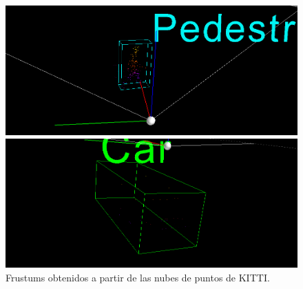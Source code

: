 \begin{figure}[H]
	\begin{minipage}{0.495\textwidth}
		\centering
		\includegraphics[width=1\linewidth]{Book/figures/7_roi/kitti_pcl_frustum_0.png}
	\end{minipage}\hfill
	\begin{minipage}{0.495\textwidth}
		\centering
		\includegraphics[width=1\linewidth]{Book/figures/7_roi/kitti_pcl_frustum_2.png}
	\end{minipage}
	\caption{Frustums obtenidos a partir de las nubes de puntos de KITTI.}
	\label{fig:Frustums obtenidos a partir de las nubes de puntos de KITTI.}
\end{figure}